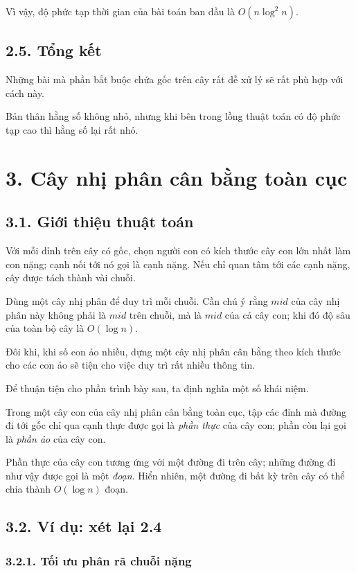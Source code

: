 \documentclass[11pt]{article}
\begin{document}
Vì vậy, độ phức tạp thời gian của bài toán ban đầu là \(O(n\log^2 n)\).

\subsection*{2.5. Tổng kết}

Những bài mà phần bắt buộc chứa gốc trên cây rất dễ xử lý sẽ rất phù hợp với
cách này.

Bản thân hằng số không nhỏ, nhưng khi bên trong lồng thuật toán có độ phức tạp
cao thì hằng số lại rất nhỏ.

\section*{3. Cây nhị phân cân bằng toàn cục}

\subsection*{3.1. Giới thiệu thuật toán}

Với mỗi đỉnh trên cây có gốc, chọn người con có kích thước cây con lớn nhất
làm con nặng; cạnh nối tới nó gọi là cạnh nặng. Nếu chỉ quan tâm tới các cạnh
nặng, cây được tách thành vài chuỗi.

Dùng một cây nhị phân để duy trì mỗi chuỗi. Cần chú ý rằng \(mid\) của cây
nhị phân này không phải là \(mid\) trên chuỗi, mà là \(mid\) của cả cây con;
khi đó độ sâu của toàn bộ cây là \(O(\log n)\).

Đôi khi, khi số con ảo nhiều, dựng một cây nhị phân cân bằng theo kích thước
cho các con ảo sẽ tiện cho việc duy trì rất nhiều thông tin.

Để thuận tiện cho phần trình bày sau, ta định nghĩa một số khái niệm.

Trong một cây con của cây nhị phân cân bằng toàn cục, tập các đỉnh mà đường đi
tới gốc chỉ qua cạnh thực được gọi là \emph{phần thực} của cây con; phần còn
lại gọi là \emph{phần ảo} của cây con.

Phần thực của cây con tương ứng với một đường đi trên cây; những đường đi như
vậy được gọi là một \emph{đoạn}. Hiển nhiên, một đường đi bất kỳ trên cây có
thể chia thành \(O(\log n)\) đoạn.

\subsection*{3.2. Ví dụ: xét lại 2.4}

\subsubsection*{3.2.1. Tối ưu phân rã chuỗi nặng}
\end{document}
